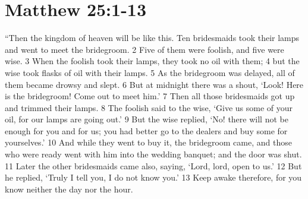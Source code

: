 \chapter{Matthew 25:1-13}
\label{ch:matt25}

``Then the kingdom of heaven will be like this. Ten bridesmaids took their 
lamps and went to meet the bridegroom. 2 Five of them were foolish, and 
five were wise. 3 When the foolish took their lamps, they took no oil with them;
4 but the wise took flasks of oil with their lamps. 5 As the bridegroom was 
delayed, all of them became drowsy and slept. 6 But at midnight there was a 
shout, `Look! Here is the bridegroom! Come out to meet him.' 7 Then all those 
bridesmaids got up and trimmed their lamps. 8 The foolish said to the wise, 
`Give us some of your oil, for our lamps are going out.' 9 But the wise replied,
`No! there will not be enough for you and for us; you had better go to the 
dealers and buy some for yourselves.' 10 And while they went to buy it, the 
bridegroom came, and those who were ready went with him into the wedding 
banquet; and the door was shut. 11 Later the other bridesmaids came also, 
saying, `Lord, lord, open to us.' 12 But he replied, `Truly I tell you, I do not
know you.' 13 Keep awake therefore, for you know neither the day nor the hour.
